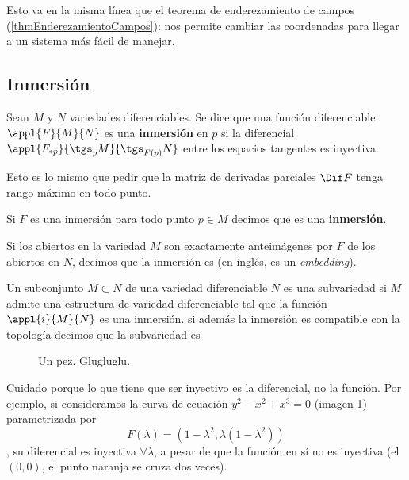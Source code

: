 Esto va en la misma línea que el teorema de enderezamiento de campos (\ref{thmEnderezamientoCampos}): nos permite cambiar las coordenadas para llegar a un sistema más fácil de manejar.

\subsection{Inmersión}
\begin{defn}[Inmersión] Sean $M$ y $N$ variedades diferenciables. Se dice que una función diferenciable $\appl{F}{M}{N}$ es una \textbf{inmersión} en $p$ si la diferencial $\appl{F_{*p}}{\tgs_pM}{\tgs_{F(p)}N}$ entre los espacios tangentes es inyectiva.

Esto es lo mismo que pedir que la matriz de derivadas parciales $\Dif F$ tenga rango máximo en todo punto.

Si $F$ es una inmersión para todo punto $p\in M$ decimos que es una \textbf{inmersión}. \label{defInmersion}
\end{defn}

Si los abiertos en la variedad $M$ son exactamente anteimágenes por $F$ de los abiertos en $N$, decimos que la inmersión es  (en inglés, es un \textit{embedding}).

Un subconjunto $M \subset N$ de una variedad diferenciable $N$ es una subvariedad si $M$ admite una estructura de variedad diferenciable tal que la función $\appl{i}{M}{N}$ es una inmersión. si además la inmersión es compatible con la topología decimos que la subvariedad es 

\begin{example}

\begin{figure}[hbtp]
\centering
{}
\caption{Un pez. Glugluglu.}
\label{figPez}
\end{figure}

Cuidado porque lo que tiene que ser inyectivo es la diferencial, no la función. Por ejemplo, si consideramos la curva de ecuación $y^2 - x^2 + x^3 = 0$ (imagen \ref{figPez}) parametrizada por \[ F(λ) = (1-λ^2, λ(1-λ^2)) \], su diferencial es inyectiva $∀λ$, a pesar de que la función en sí no es inyectiva (el $(0,0)$, el punto naranja se cruza dos veces).
\end{example}


